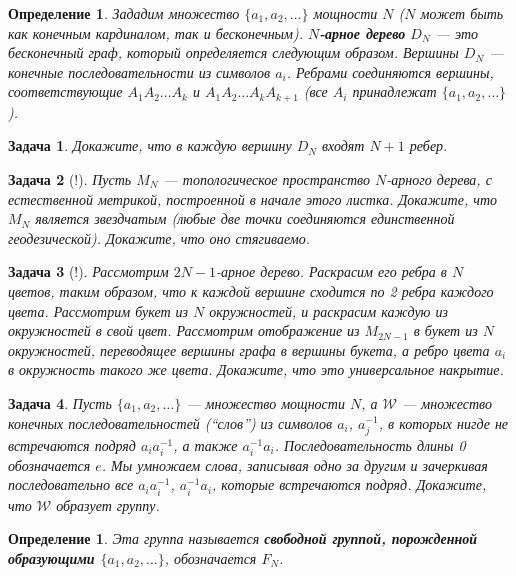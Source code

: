 \documentclass[12pt]{book}
\theoremstyle{upshape}
\newtheorem{zadacha}{Задача}[chapter]
\theoremstyle{generic}
\newtheorem{opredelenie}[teorema]{Определение}
\theoremstyle{upshapenonumber}
\newcommand{\следствие}{%
     \refstepcounter{teorema}
     {\noindent\bf Следствие \thechapter.\arabic{teorema}:\ }}
\newcommand{\пример}{%
     \refstepcounter{teorema}
     {\noindent\bf Пример \thechapter.\arabic{teorema}:\ }}
\newcommand{\лемма}{%
     \refstepcounter{teorema}
     {\noindent\bf Лемма \thechapter.\arabic{teorema}:\ }}
\newcommand{\теорема}{%
     \refstepcounter{teorema}
     {\noindent\bf Теорема \thechapter.\arabic{teorema}:\ }}
\newcommand{\утверждение}{%
     \refstepcounter{teorema}
     {\noindent\bf Утверждение \thechapter.\arabic{teorema}:\ }}
\begin{document}
{\begin{opredelenie}
Зададим множество $\{a_1, a_2, \dots\}$ мощности 
$N$ ($N$ может быть как конечным кардиналом, так
и бесконечным). {\bf $N$-арное дерево} $D_N$ --- это бесконечный
граф, который определяется следующим образом.
Вершины $D_N$ --- конечные последовательности
из символов $a_i$. Ребрами соединяются
вершины, соответствующие $A_1A_2 \dots A_k$
и $A_1A_2 \dots A_kA_{k+1}$ (все $A_i$ принадлежат
$\{a_1, a_2, \dots\}$).
\end{opredelenie}

\begin{zadacha} Докажите, что в каждую вершину 
$D_N$ входят $N+1$ ребер.
\end{zadacha}

\begin{zadacha}[!]
Пусть $M_N$ --- топологическое пространство 
$N$-арного дерева, с естественной метрикой, построенной в
начале этого листка.  Докажите, что $M_N$ является звездчатым
(любые две точки соединяются единственной геодезической).
Докажите, что оно стягиваемо.
\end{zadacha}

\begin{zadacha}[!]
Рассмотрим $2N-1$-арное дерево.
Раскрасим его ребра в $N$ цветов, таким образом,
что к каждой вершине сходится по 2 ребра каждого цвета.
Рассмотрим букет из $N$ окружностей, и раскрасим
каждую из окружностей в свой цвет. 
Рассмотрим отображение из $M_{2N-1}$ в букет из $N$
окружностей, переводящее вершины графа 
в вершины букета, а ребро цвета $a_i$ в 
окружность такого же цвета. Докажите, что
это универсальное накрытие.
\end{zadacha}

\begin{zadacha} 
Пусть $\{a_1, a_2, \dots\}$ --- множество мощности 
$N$, а ${\mathcal W}$ --- множество конечных последовательностей
(``слов'') из символов $a_i$, $a_j^{-1}$, в которых нигде 
не встречаются подряд $a_ia_i^{-1}$, а также
$a_i^{-1}a_i$. Последовательность длины 
0 обозначается $e$. Мы умножаем слова, записывая
одно за другим и зачеркивая последовательно
все $a_ia_i^{-1}$, $a_i^{-1}a_i$, которые
встречаются подряд. Докажите, что ${\mathcal W}$
образует группу.
\end{zadacha}

\begin{opredelenie}
Эта группа называется {\bf свободной группой, порожденной 
образующими $\{a_1, a_2, \dots\}$}, обозначается $F_N$.
\end{opredelenie}

}
\end{document}
